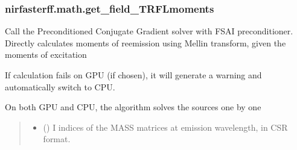 \documentclass[letterpaper,10pt,english]{sphinxmanual}
\begin{document}
\sphinxstepscope


\subsubsection{nirfasterff.math.get\_field\_TRFLmoments}
\label{\detokenize{_autosummary/nirfasterff.math.get_field_TRFLmoments:nirfasterff-math-get-field-trflmoments}}\label{\detokenize{_autosummary/nirfasterff.math.get_field_TRFLmoments::doc}}

\begin{fulllineitems}
\label{\detokenize{_autosummary/nirfasterff.math.get_field_TRFLmoments:nirfasterff.math.get_field_TRFLmoments}}
\pysigstartsignatures
{}
\pysigstopsignatures
\sphinxAtStartPar
Call the Preconditioned Conjugate Gradient solver with FSAI preconditioner. Directly calculates moments of re\sphinxhyphen{}emission using Mellin transform, given the moments of excitation

\sphinxAtStartPar
If calculation fails on GPU (if chosen), it will generate a warning and automatically switch to CPU.

\sphinxAtStartPar
On both GPU and CPU, the algorithm solves the sources one by one
\begin{quote}\begin{description}
\begin{itemize}
\item {} 
\sphinxAtStartPar
{} (\sphinxstyleliteralemphasis{\sphinxupquote{, }}) \textendash{} I indices of the MASS matrices at emission wavelength, in CSR format.


\end{itemize}
\end{description}
\end{quote}
\end{fulllineitems}
\end{document}
